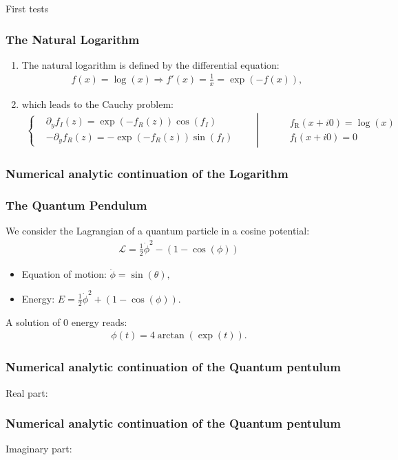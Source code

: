 \begin{section}{First tests}
  \begin{frame}
    \frametitle{The Natural Logarithm}
    \begin{enumerate}
    \item The natural logarithm is defined by the differential equation:
      \begin{align*}
        f(x) = \log(x) \Rightarrow f'(x) = \frac{1}{x} = \exp(-f(x)),
      \end{align*}
      \item which leads to the Cauchy problem:
        \begin{align*}
          \left\{
          \begin{aligned}
            &\partial_yf_I(z) = \exp(-f_R(z))\cos(f_I)\\
            &-\partial_yf_R(z) = -\exp(-f_R(z))\sin(f_I)
          \end{aligned}
          \qquad
          \right|
          \qquad
          \begin{aligned}
            &f_{\mathrm R}(x+i0) = \log(x)\\
            &f_{\mathrm I}(x+i0) = 0
          \end{aligned}
        \end{align*}
    \end{enumerate}
  \end{frame}
  \begin{frame}
    \frametitle{Numerical analytic continuation of the Logarithm}
    
    
  \end{frame}

  \begin{frame}
    \frametitle{The Quantum Pendulum}
    We consider the Lagrangian of a quantum particle in a cosine potential:
    \begin{align*}
      \mathcal L = \frac{1}{2}\dot\phi^2-(1-\cos(\phi))
    \end{align*}
    \begin{itemize}
    \item Equation of motion: $\ddot \phi = \sin(\theta),$
    \item Energy: $E = \frac{1}{2}\dot\phi^2+(1-\cos(\phi)).$
    \end{itemize}
    A solution of 0 energy reads:
    \begin{align*}
      \phi(t) = 4\arctan(\exp(t)).
    \end{align*}
  \end{frame}
  \begin{frame}
    \frametitle{Numerical analytic continuation of the Quantum pentulum}
    Real part:
    
  \end{frame}
  \begin{frame}
    \frametitle{Numerical analytic continuation of the Quantum pentulum}
    Imaginary part:
    
  \end{frame}


\end{section}

